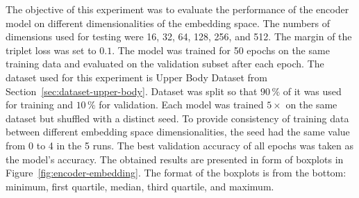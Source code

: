 The objective of this experiment was to evaluate the performance of the encoder model on different dimensionalities of the embedding space. The numbers of dimensions used for testing were 16, 32, 64, 128, 256, and 512. The margin of the triplet loss was set to $0.1$. The model was trained for 50 epochs on the same training data and evaluated on the validation subset after each epoch. The dataset used for this experiment is Upper Body Dataset from Section~\ref{sec:dataset-upper-body}. Dataset was split so that $90\,\%$ of it was used for training and $10\,\%$ for validation. Each model was trained $5 \times$ on the same dataset but shuffled with a distinct seed. To provide consistency of training data between different embedding space dimensionalities, the seed had the same value from 0 to 4 in the 5 runs. The best validation accuracy of all epochs was taken as the model's accuracy. The obtained results are presented in form of boxplots in Figure~\ref{fig:encoder-embedding}. The format of the boxplots is from the bottom: minimum, first quartile, median, third quartile, and maximum.

